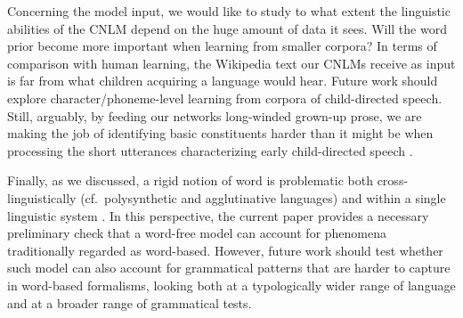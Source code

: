 Concerning the model input, we would like to study to what extent the
linguistic abilities of the CNLM depend on the huge amount of
data it sees.  Will the word prior become more important when learning
from smaller corpora? In terms of comparison with human learning, the
Wikipedia text our CNLMs receive as input is far from what children
acquiring a language would hear. Future work should explore
character/phoneme-level learning from corpora of child-directed
speech. Still, arguably, by feeding our networks long-winded grown-up
prose, we are making the job of identifying basic constituents harder
than it might be when processing the short utterances characterizing
early child-directed speech \cite{Tomasello:2003}.

Finally, as we discussed, a rigid notion of word is problematic both
cross-linguistically (cf.~polysynthetic and agglutinative languages)
and within a single linguistic system \cite[cf.~the common view that
the lexicon hosts units at different levels of the linguistic
hierarchy, from morphemes to large syntactic constructions,
e.g.,][]{Jackendoff:1997,Croft:Cruse:2004,Goldberg:2005}. In this
perspective, the current paper provides a necessary preliminary check
that a word-free model can account for phenomena traditionally
regarded as word-based. However, future work should test whether such
model can also account for grammatical patterns that are harder to
capture in word-based formalisms, looking both at a typologically
wider range of language and at a broader range of grammatical tests.



